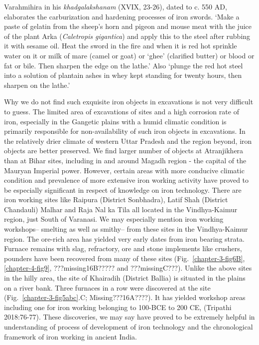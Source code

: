 Varahmihira in his {\it khadgalakshanam} (XVIX, 23-26), dated to c. 550 AD, elaborates the carburization and hardening processes of iron swords. ‘Make a paste of gelatin from the sheep’s horn and pigeon and mouse meat with the juice of the plant Arka ({\it Caletropis gigantica}) and apply this to the steel after rubbing it with sesame oil. Heat the sword in the fire and when it is red hot sprinkle water on it or milk of mare (camel or goat) or ‘ghee’ (clarified butter) or blood or fat or bile. Then sharpen the edge on the lathe.’ Also ‘plunge the red hot steel into a solution of plantain ashes in whey kept standing for twenty hours, then sharpen on the lathe.’ 


Why we do not find such exquisite iron objects in excavations is not very difficult to guess. The limited area of excavations of sites and a high corrosion rate of iron, especially in the Gangetic plains with a humid climatic condition is primarily responsible for non-availability of such iron objects in excavations. In the relatively drier climate of western Uttar Pradesh and the region beyond, iron objects are better preserved. We find larger number of objects at Atranjikhera than at Bihar sites, including in and around Magadh region - the capital of the Mauryan Imperial power. However, certain areas with more conducive climatic condition and prevalence of more extensive iron working activity have proved to be especially significant in respect of knowledge on iron technology.  There are iron working sites like Raipura (District Sonbhadra), Latif Shah (District Chandauli) Malhar and Raja Nal ka Tila all located in the Vindhya-Kaimur region, just South of Varanasi. We may especially mention iron working workshops– smelting as well as smithy– from these sites in the Vindhya-Kaimur region. The ore-rich area has yielded very early dates from iron bearing strata. Furnace remains with slag, refractory, ore and stone implements like crushers, pounders have been recovered from many of these sites (Fig.~\ref{chapter-3-fig6B}, \ref{chapter-4-fig9}, ???missing16B????? and ???missingC???). Unlike the above sites in the hilly area, the site of Khairadih (District Ballia) is situated in the plains on a river bank. Three furnaces in a row were discovered at the site (Fig.~\ref{chapter-3-fig5abc}.C; Missing???16A????). It has yielded workshop areas including one for iron working belonging to 100-BCE to 200 CE, (Tripathi 2018:76-77). These discoveries, we may say have proved to be extremely helpful in understanding of process of development of iron technology  and the chronological framework of iron working in ancient India.

